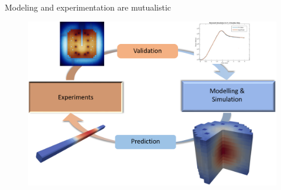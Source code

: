 \documentclass[8pt,xcolor=dvipnames]{beamer}
\begin{document}
\begin{frame}{Modeling and experimentation are mutualistic}

\begin{figure}
\includegraphics[width=\linewidth]{figures/relationship_chart.png}
\end{figure}

\end{frame}
\end{document}
